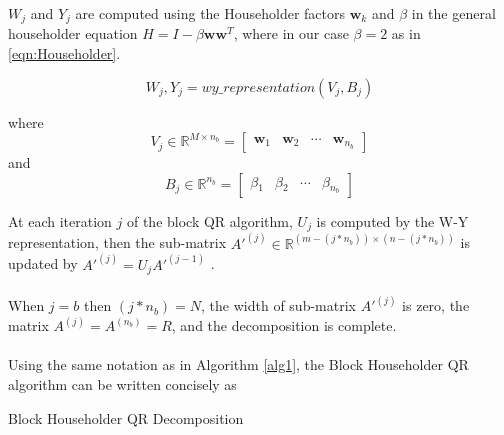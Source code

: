 \documentclass{article}
\begin{document}
$W_j$ and $Y_j$ are computed using the Householder factors $\mathbf{w}_k$ and $\beta{}$ in the general householder equation $H = I - \beta{}\mathbf{w}\mathbf{w}^T$, where in our case $\beta = 2$ as in \eqref{eqn:Householder}.

\begin{equation}
W_j, Y_j = wy\_representation(V_j, B_j)
\end{equation}

where 
\begin{equation}
V_j \in \mathbb{R}^{M \times n_b} =
\begin{bmatrix}
\mathbf{w}_1 & \mathbf{w}_2 & \cdots & \mathbf{w}_{n_b}
\end{bmatrix}
\end{equation}
and
\begin{equation}
B_j \in \mathbb{R}^{n_b} = 
\begin{bmatrix}
\beta{}_1 & \beta{}_2 & \cdots & \beta{}_{n_b}
\end{bmatrix}
\end{equation}

At each iteration $j$ of the block QR algorithm, $U_j$ is computed by the W-Y representation, then the sub-matrix $A'^{(j)} \in \mathbb{R}^{(m - (j * n_b)) \times (n - (j * n_b))}$ is updated by $A'^{(j)} = U_{j}A'^{(j-1)}$ \cite{doi:10.1137/19M1296367} \cite{golub}.

\paragraph{}
When $j = b$ then $(j * n_b) = N$, the width of sub-matrix $A'^{(j)}$ is zero, the matrix $A^{(j)} = A^{(n_b)} = R$, and the decomposition is complete.

\paragraph{}
Using the same notation as in Algorithm \ref{alg1}, the Block Householder QR algorithm can be written concisely as
\begin{algorithm}
\label{blockqr}
\caption{Block Householder QR Decomposition}
\begin{algorithmic}
\ENDFOR


\ENDWHILE
\end{algorithmic}
\end{algorithm}



\end{document}
